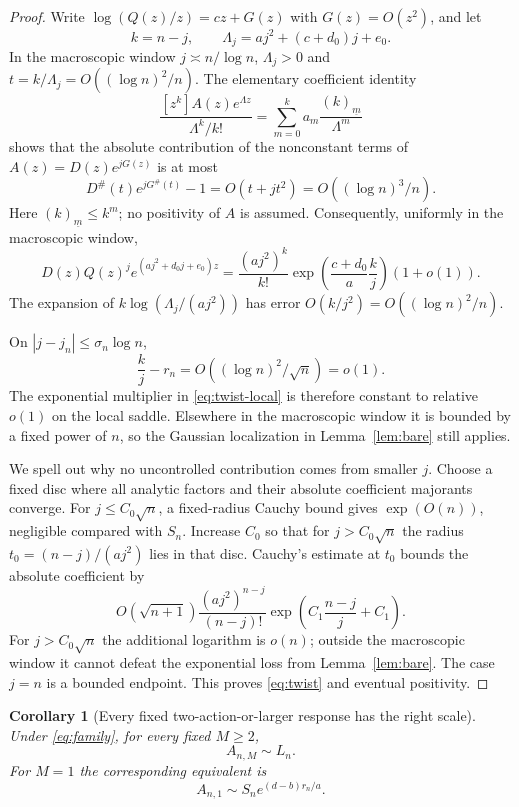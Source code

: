 \documentclass[11pt,a4paper]{article}
\numberwithin{equation}{section}
\newtheorem{corollary}[theorem]{Corollary}
\theoremstyle{definition}
\theoremstyle{remark}
\newcommand{\fall}[2]{(#1)_{\underline{#2}}}
\begin{document}
\begin{proof}
Write $\log(Q(z)/z)=cz+G(z)$ with $G(z)=O(z^2)$, and let
\[
 k=n-j,\qquad \Lambda_j=a j^2+(c+d_0)j+e_0.
\]
In the macroscopic window $j\asymp n/\log n$, $\Lambda_j>0$ and
$t=k/\Lambda_j=O((\log n)^2/n)$. The elementary coefficient identity
\begin{equation}
 \frac{[z^k]A(z)e^{\Lambda z}}{\Lambda^k/k!}
 =\sum_{m=0}^{k}a_m\frac{\fall{k}{m}}{\Lambda^m}
 \label{eq:poisson-coeff}
\end{equation}
shows that the absolute contribution of the nonconstant terms of
$A(z)=D(z)e^{jG(z)}$ is at most
\[
 D^{\#}(t)e^{jG^{\#}(t)}-1=O(t+jt^2)=O((\log n)^3/n).
\]
Here $\fall{k}{m}\le k^m$; no positivity of $A$ is assumed. Consequently,
uniformly in the macroscopic window,
\begin{equation}
 [z^n]D(z)Q(z)^j e^{(a j^2+d_0j+e_0)z}
 =\frac{(a j^2)^k}{k!}
   \exp\!\left(\frac{c+d_0}{a}\frac{k}{j}\right)(1+o(1)).
 \label{eq:twist-local}
\end{equation}
The expansion of $k\log(\Lambda_j/(a j^2))$ has error
$O(k/j^2)=O((\log n)^2/n)$.

On $|j-j_n|\le\sigma_n\log n$,
\[
 \frac{k}{j}-r_n=O((\log n)^2/\sqrt n)=o(1).
\]
The exponential multiplier in \eqref{eq:twist-local} is therefore
constant to relative $o(1)$ on the local saddle. Elsewhere in the
macroscopic window it is bounded by a fixed power of $n$, so the
Gaussian localization in Lemma~\ref{lem:bare} still applies.

We spell out why no uncontrolled contribution comes from smaller $j$.
Choose a fixed disc where all analytic factors and their absolute
coefficient majorants converge. For $j\le C_0\sqrt n$, a fixed-radius
Cauchy bound gives $\exp(O(n))$, negligible compared with $S_n$.
Increase $C_0$ so that for $j>C_0\sqrt n$ the radius
$t_0=(n-j)/(a j^2)$ lies in that disc. Cauchy's estimate at $t_0$ bounds
the absolute coefficient by
\[
 O(\sqrt{n+1})\frac{(a j^2)^{n-j}}{(n-j)!}
                 \exp\!\left(C_1\frac{n-j}{j}+C_1\right).
\]
For $j>C_0\sqrt n$ the additional logarithm is $o(n)$; outside the
macroscopic window it cannot defeat the exponential loss from
Lemma~\ref{lem:bare}. The case $j=n$ is a bounded endpoint. This proves
\eqref{eq:twist} and eventual positivity.
\end{proof}

\begin{corollary}[Every fixed two-action-or-larger response has the right scale]
\label{cor:response-scale}
Under \eqref{eq:family}, for every fixed $M\ge2$,
\begin{equation}
 A_{n,M}\sim L_n.
 \label{eq:response-scale}
\end{equation}
For $M=1$ the corresponding equivalent is
\begin{equation}
 A_{n,1}\sim S_n e^{(d-b)r_n/a}.
 \label{eq:onecore-scale}
\end{equation}
\end{corollary}
\end{document}
